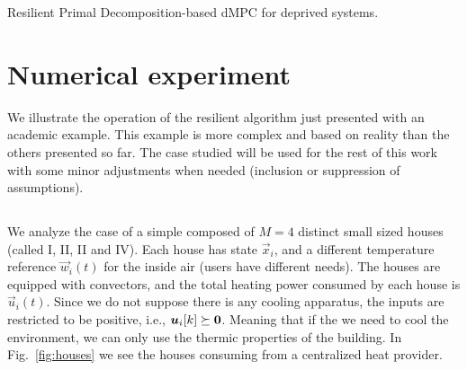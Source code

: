 \documentclass[../main.tex]{subfiles}
\begin{document}
\begin{algorithm2e}[h]
  \DontPrintSemicolon
  \caption{Resilient Primal Decomposition-based dMPC for deprived systems.}\label{alg:rpdbdmpcss}
\end{algorithm2e}

\section{Numerical experiment}\label{sec:numerical-experiment}

We illustrate the operation of the resilient algorithm just presented with an academic example.
This example is more complex and based on reality than the others presented so far.
The case studied will be used for the rest of this work with some minor adjustments when needed (inclusion or suppression of assumptions).

\subsection{\dhnlong}\label{sec:case-study}
We analyze the case of a simple \dhn{} composed of ${M=4}$ distinct small sized houses (called I, II, II and IV).
Each house has state $\vec{x}_{i}$, and a different temperature reference $\vec{w}_{i}(t)$ for the inside air (users have different needs).
The houses are equipped with convectors, and the total heating power consumed by each house is $\vec{u}_{i}(t)$.
Since we do not suppose there is any cooling apparatus, the inputs are restricted to be positive, i.e., $\boldsymbol{u}_{i}[k]\succeq\mathbf{0}$. Meaning that if the we need to cool the environment, we can only use the thermic properties of the building.
In Fig.~\ref{fig:houses} we see the houses consuming from a centralized heat provider.
\end{document}

